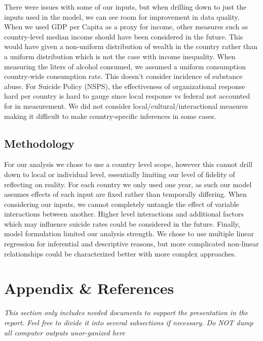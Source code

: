 \documentclass[]{article}
\begin{document}
\newpage 

There were issues with some of our inputs, but when drilling down to
just the inputs used in the model, we can see room for improvement in
data quality. When we used GDP per Capita as a proxy for income, other
measures such as country-level median income should have been considered
in the future. This would have given a non-uniform distribution of
wealth in the country rather than a uniform distribution which is not
the case with income inequality. When measuring the liters of alcohol
consumed, we assumed a uniform consumption country-wide consumption
rate. This doesn't consider incidence of substance abuse. For Suicide
Policy (NSPS), the effectiveness of organizational response hard per
country is hard to gauge since local response vs federal not accounted
for in measurement. We did not consider local/cultural/interactional
measures making it difficult to make country-specific inferences in some
cases.

\subsection{Methodology}\label{methodology-1}

For our analysis we chose to use a country level scope, however this
cannot drill down to local or individual level, essentially limiting our
level of fidelity of reflecting on reality. For each country we only
used one year, as such our model assumes effects of each input are fixed
rather than temporally differing. When considering our inputs, we cannot
completely untangle the effect of variable interactions between another.
Higher level interactions and additional factors which may influence
suicide rates could be considered in the future. Finally, model
formulation limited our analysis strength. We chose to use multiple
linear regression for inferential and descriptive reasons, but more
complicated non-linear relationships could be characterized better with
more complex approaches.

\section{Appendix \& References}\label{appendix-references}

\emph{This section only includes needed documents to support the
presentation in the report. Feel free to divide it into several
subsections if necessary. Do NOT dump all computer outputs unor-ganized
here}
\end{document}
